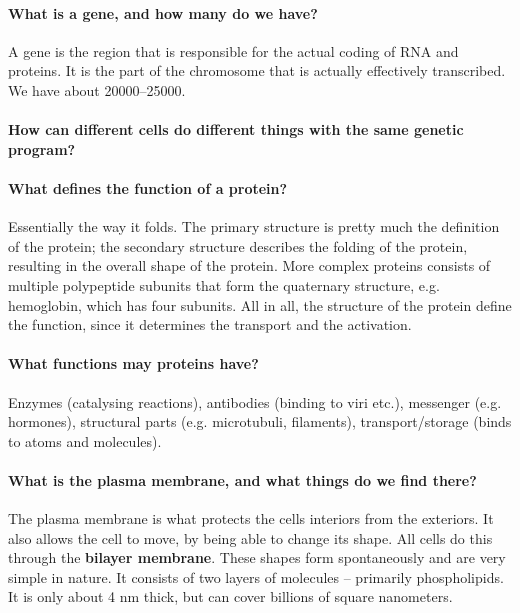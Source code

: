 \documentclass[a4paper,12pt]{article}
\begin{document}
      \paragraph{What is a gene, and how many do we have?\\}
         A gene is the region that is responsible for the actual coding of RNA
         and proteins. It is the part of the chromosome that is actually
         effectively transcribed. We have about 20000--25000. 

      \paragraph{How can different cells do different things with the same genetic
      program?\\}
         
      \paragraph{What defines the function of a protein?\\}
         Essentially the way it folds. The primary structure is pretty much the definition
         of the protein; the secondary structure describes the folding of the
         protein, resulting in the overall shape of the protein. More complex
         proteins consists of multiple polypeptide subunits that form the
         quaternary structure, e.g. hemoglobin, which has four subunits. 
         All in all, the structure of the protein define the function, since it
         determines the transport and the activation. 

      \paragraph{What functions may proteins have?\\}
         Enzymes (catalysing reactions), antibodies (binding to viri etc.), 
         messenger (e.g. hormones), structural parts (e.g. microtubuli,
         filaments), transport/storage (binds to atoms and molecules).

      \paragraph{What is the plasma membrane, and what things do we find
      there?\\}
         The plasma membrane is what protects the cells interiors from the
         exteriors. It also allows the cell to move, by being able to change
         its shape. All cells do this through the \textbf{bilayer membrane}.
         These shapes form spontaneously and are very simple in nature. It
         consists of two layers of molecules -- primarily phospholipids. It is
         only about 4 nm thick, but can cover billions of square nanometers. 
\end{document}
